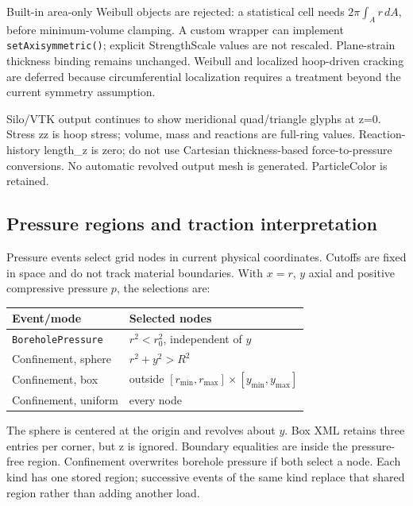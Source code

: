 Built-in area-only Weibull objects are rejected: a statistical cell needs
$2\pi\int_A r\,dA$, before minimum-volume clamping. A custom wrapper can
implement \texttt{setAxisymmetric()}; explicit StrengthScale values are not
rescaled. Plane-strain thickness binding remains unchanged. Weibull and
localized hoop-driven cracking are deferred because circumferential
localization requires a treatment beyond the current symmetry assumption.

Silo/VTK output continues to show meridional quad/triangle glyphs at z=0.
Stress zz is hoop stress; volume, mass and reactions are full-ring values.
Reaction-history length\_z is zero; do not use Cartesian thickness-based
force-to-pressure conversions.
No automatic revolved output mesh is generated. ParticleColor is retained.

\subsection{Pressure regions and traction interpretation}
Pressure events select grid nodes in current physical coordinates. Cutoffs
are fixed in space and do not track material boundaries. With $x=r$, $y$
axial and positive compressive pressure $p$, the selections are:
\begin{center}
\begin{tabular}{ll}
Event/mode & Selected nodes \\
\hline
\texttt{BoreholePressure} & $r^2<r_0^2$, independent of $y$ \\
Confinement, sphere & $r^2+y^2>R^2$ \\
Confinement, box & outside $[r_{\min},r_{\max}]\times[y_{\min},y_{\max}]$ \\
Confinement, uniform & every node
\end{tabular}
\end{center}
The sphere is centered at the origin and revolves about $y$. Box XML retains
three entries per corner, but z is ignored. Boundary equalities are inside
the pressure-free region. Confinement overwrites borehole pressure if both
select a node. Each kind has one stored region; successive events of the same
kind replace that shared region rather than adding another load.


